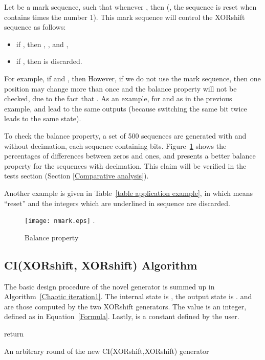 \documentclass[journal]{IEEEtran}
\begin{document}
Let  be a mark sequence, such that whenever ,
then  (, the sequence is reset when  contains  times the number 1). This mark sequence will control the XORshift sequence  as follows:
\begin{itemize}
\item if , then , , and ,
\item if , then  is discarded.
\end{itemize}
For example, if  and , then  However, if we do not use the mark sequence, then one position may change more than once and the balance property will not be checked, due to the fact that . As an example, for  and  as in the previous example,  and  lead to the same outputs (because switching the same bit twice leads to the same state).

 
To check the balance property, a set of 500
sequences are generated with and without decimation, each
sequence containing  bits. Figure~\ref{nmark} shows the
percentages of differences between zeros and ones, and presents a better balance property for the sequences with decimation. This claim will be verified in the tests section (Section \ref{Comparative analysis}). 


Another example is given in Table~\ref{table application example}, in which  means ``reset'' and the integers which are underlined in sequence  are discarded.







\begin{figure}
\centering
\texttt{[image: nmark.eps]}
\DeclareGraphicsExtensions.
\caption{Balance property}
\label{nmark}
\end{figure}

\subsection{CI(XORshift, XORshift) Algorithm}

The basic design procedure of the novel generator is summed up in Algorithm~\ref{Chaotic iteration1}.
The internal state is , the output state is .  and  are those computed by the two XORshift
generators. The value  is an integer, defined as in Equation~\ref{Formula}. Lastly,  is a constant defined by the user.
\begin{algorithm}
\SetAlgoLined
{}
\For{}
{
\;
}
\;
\;
\;
\For{}
{
\;
\;
\If{}
{
\;
\;
}
\ElseIf{}
{
\;
}
}
\;
return \;
\medskip
\caption{An arbitrary round of the new CI(XORshift,XORshift) generator}
\label{Chaotic iteration1}
\end{algorithm}
\end{document}
